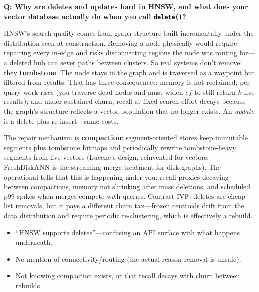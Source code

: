 \begin{interviewq}
\textbf{Q: Why are deletes and updates hard in HNSW, and what does your vector database actually do when you call \texttt{delete()}?}

 \quad {} \quad \badgefreq{\freqmed}

\stronganswer

HNSW's search quality comes from graph structure built incrementally under the distribution seen at construction. Removing a node physically would require repairing every in-edge and risks disconnecting regions the node was routing for---a deleted hub can sever paths between clusters. So real systems don't remove: they \textbf{tombstone}. The node stays in the graph and is traversed as a waypoint but filtered from results. That has three consequences: memory is not reclaimed; per-query work rises (you traverse dead nodes and must widen $ef$ to still return $k$ live results); and under sustained churn, recall at fixed search effort decays because the graph's structure reflects a vector population that no longer exists. An \textit{update} is a delete plus re-insert---same costs.

The repair mechanism is \textbf{compaction}: segment-oriented stores keep immutable segments plus tombstone bitmaps and periodically rewrite tombstone-heavy segments from live vectors (Lucene's design, reinvented for vectors; FreshDiskANN is the streaming-merge treatment for disk graphs). The operational tells that this is happening under you: recall proxies decaying between compactions, memory not shrinking after mass deletions, and scheduled p99 spikes when merges compete with queries. Contrast IVF: deletes are cheap list removals, but it pays a different churn tax---frozen centroids drift from the data distribution and require periodic re-clustering, which is effectively a rebuild.

\redflags
\begin{itemize}
    \item ``HNSW supports deletes''---confusing an API surface with what happens underneath.
    \item No mention of connectivity/routing (the actual reason removal is unsafe).
    \item Not knowing compaction exists, or that recall decays with churn between rebuilds.
\end{itemize}



\end{interviewq}
